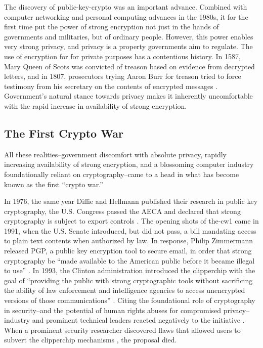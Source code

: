 The discovery of \ac{public-key-crypto} was an important advance. Combined with computer networking and personal
computing advances in the 1980s, it for the first time put the power of strong encryption not just in the hands of
governments and militaries, but of ordinary people. However, this power enables very strong privacy, and privacy is a
property governments aim to regulate. The use of encryption for for private purposes has a contentious history. In 1587,
Mary Queen of Scots was convicted of treason based on evidence from decrypted letters, and in 1807, prosecutors trying
Aaron Burr for treason tried to force testimony from his secretary on the contents of encrypted messages
\cite{kerr_encryption_2017}. Government's natural stance towards privacy makes it inherently uncomfortable with the
rapid increase in availability of strong encryption.


\subsection{The First Crypto War}
\label{sec-history-cw1}

All these realities--government discomfort with absolute privacy, rapidly increasing availability of strong encryption,
and a blossoming computer industry foundationally reliant on cryptography--came to a head in what has become known as
the first ``crypto war.''

In 1976, the same year Diffie and Hellmann published their research in public key cryptography, the U.S. Congress passed
the \ac{AECA} and declared that strong cryptography is subject to export controls \cite{kehl_right_2015}. The opening
shots of \ac{the-cw1} came in 1991, when the U.S. Senate introduced, but did not pass, a bill mandating access to plain
text contents when authorized by law. In response, Philip Zimmermann released \ac{PGP}, a public key encryption tool to
secure email, in order that strong cryptography be ``made available to the American public before it became illegal to
use'' \cite{zimmermann_1996}. In 1993, the Clinton administration introduced the \ac{clipperchip} \cite{press_1993} with
the goal of ``providing the public with strong cryptographic tools without sacrificing the ability of law enforcement
and intelligence agencies to access unencrypted versions of those communications'' \cite{thompson_2015}. Citing the
foundational role of cryptography in security--and the potential of human rights abuses for compromised
privacy--industry and prominent technical leaders reacted negatively to the initiative \cite{kehl_right_2015}
\cite{zimmermann_1996}. When a prominent security researcher discovered flaws that allowed users to subvert the
\ac{clipperchip} mechanisms \cite{blaze_protocol_1994}, the proposal died.

